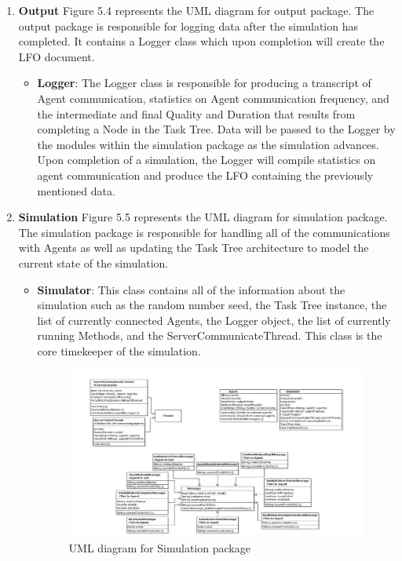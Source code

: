 \begin{enumerate}
\item \textbf{Output} Figure 5.4 represents the UML diagram for output package. The output package is responsible for logging data after the simulation has completed. It contains a Logger class which upon completion will create the LFO document. \\

\begin{itemize}
\item \textbf{Logger}: The Logger class is responsible for producing a  transcript of Agent communication, statistics on Agent communication frequency, and the intermediate and final Quality and Duration that results from completing a Node in the Task Tree. Data will be passed to the Logger by the modules within the simulation package as the simulation advances. Upon completion of a simulation, the Logger will compile statistics on agent communication and produce the LFO containing the previously mentioned data. \\
\end{itemize}

\item \textbf{Simulation}  Figure 5.5 represents the UML diagram for simulation package. The simulation package is responsible for handling all of the communications with Agents as well as updating the Task Tree architecture to model the current state of the simulation. \\

\begin{itemize}
\item \textbf{Simulator}: This class contains all of the information about the simulation such as the random number seed, the Task Tree instance, the list of currently connected Agents, the Logger object, the list of currently running Methods, and the ServerCommunicateThread. This class is the core timekeeper of the simulation. \\

\begin{figure}[H]
\centering
\includegraphics[width=6.0in]{figs/simulationUML}
\caption{UML diagram for Simulation package}
\label{fig:Simulation}
\end{figure}




\end{itemize}
\end{enumerate}

